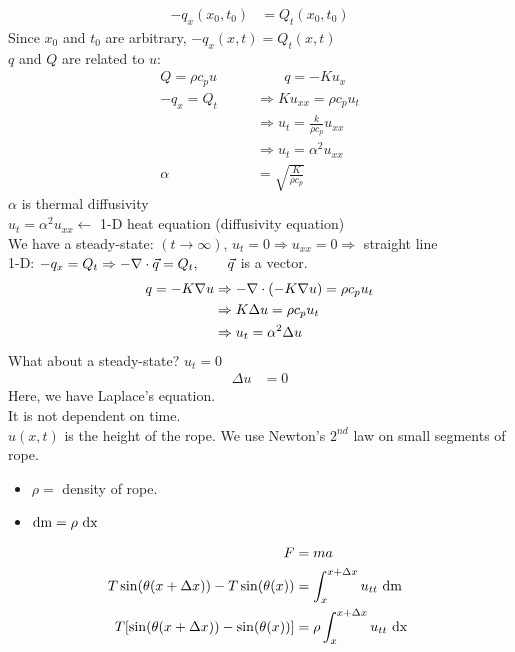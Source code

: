 \begin{align}
  -q_x(x_0, t_0) & = Q_t(x_0, t_0)
\end{align}
Since $x_0$ and $t_0$ are arbitrary, $-q_x(x, t) = Q_t(x, t)$\\
$q$ and $Q$ are related to $u$:
\begin{align}
  Q = \rho c_p u \qquad & \qquad q = -Ku_x\\
  -q_x = Q_t & \Rightarrow Ku_{xx} = \rho c_p u_t\\
  & \Rightarrow u_t = \frac{k}{\rho c_p} u_{xx}\\
  & \Rightarrow u_t = \alpha^2 u_{xx}\\
  \alpha & = \sqrt{\frac{K}{\rho c_p}}
\end{align}
$\alpha$ is thermal diffusivity\\
$u_t = \alpha^2 u_{xx} \leftarrow$ 1-D heat equation (diffusivity equation)\\
We have a steady-state: $(t \rightarrow \infty)$, $u_t = 0 \Rightarrow u_{xx} = 0 \Rightarrow $ straight line\\
1-D: $-q_x = Q_t \Rightarrow -\nabla \cdot \vec q = Q_t, \qquad \vec q$ is a vector.
\begin{align}
  q = -K \nabla u & \Rightarrow - \nabla \cdot (-K \nabla u) = \rho c_p u_t\\
  & \Rightarrow K \Delta u = \rho c_p u_t\\
  & \Rightarrow u_t = \alpha^2 \Delta u
\end{align}
What about a steady-state? $u_t = 0$
\begin{align}
  \Delta u & = 0
\end{align}
Here, we have Laplace's equation.\\
\note It is not dependent on time.\\
$u(x, t)$ is the height of the rope. We use Newton's $2^{nd}$ law on small segments of rope.
\begin{itemize}
  \item $\rho = $ density of rope.
  \item $\text{dm} = \rho \text{ dx }$
\end{itemize}
\begin{align}
  F & = ma\\
  T \sin(\theta(x + \Delta x)) - T \sin(\theta(x)) & = \int^{x + \Delta x}_x u_{tt} \text{ dm}\\
  T[ \sin(\theta (x + \Delta x)) - \sin(\theta (x))] & = \rho \int^{x + \Delta x}_{x} u_{tt} \text{ dx }
\end{align}
